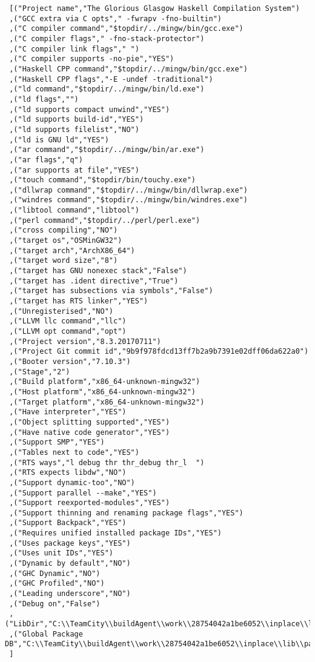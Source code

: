 \begin{verbatim}
 [("Project name","The Glorious Glasgow Haskell Compilation System")
 ,("GCC extra via C opts"," -fwrapv -fno-builtin")
 ,("C compiler command","$topdir/../mingw/bin/gcc.exe")
 ,("C compiler flags"," -fno-stack-protector")
 ,("C compiler link flags"," ")
 ,("C compiler supports -no-pie","YES")
 ,("Haskell CPP command","$topdir/../mingw/bin/gcc.exe")
 ,("Haskell CPP flags","-E -undef -traditional")
 ,("ld command","$topdir/../mingw/bin/ld.exe")
 ,("ld flags","")
 ,("ld supports compact unwind","YES")
 ,("ld supports build-id","YES")
 ,("ld supports filelist","NO")
 ,("ld is GNU ld","YES")
 ,("ar command","$topdir/../mingw/bin/ar.exe")
 ,("ar flags","q")
 ,("ar supports at file","YES")
 ,("touch command","$topdir/bin/touchy.exe")
 ,("dllwrap command","$topdir/../mingw/bin/dllwrap.exe")
 ,("windres command","$topdir/../mingw/bin/windres.exe")
 ,("libtool command","libtool")
 ,("perl command","$topdir/../perl/perl.exe")
 ,("cross compiling","NO")
 ,("target os","OSMinGW32")
 ,("target arch","ArchX86_64")
 ,("target word size","8")
 ,("target has GNU nonexec stack","False")
 ,("target has .ident directive","True")
 ,("target has subsections via symbols","False")
 ,("target has RTS linker","YES")
 ,("Unregisterised","NO")
 ,("LLVM llc command","llc")
 ,("LLVM opt command","opt")
 ,("Project version","8.3.20170711")
 ,("Project Git commit id","9b9f978fdcd13ff7b2a9b7391e02dff06da622a0")
 ,("Booter version","7.10.3")
 ,("Stage","2")
 ,("Build platform","x86_64-unknown-mingw32")
 ,("Host platform","x86_64-unknown-mingw32")
 ,("Target platform","x86_64-unknown-mingw32")
 ,("Have interpreter","YES")
 ,("Object splitting supported","YES")
 ,("Have native code generator","YES")
 ,("Support SMP","YES")
 ,("Tables next to code","YES")
 ,("RTS ways","l debug thr thr_debug thr_l  ")
 ,("RTS expects libdw","NO")
 ,("Support dynamic-too","NO")
 ,("Support parallel --make","YES")
 ,("Support reexported-modules","YES")
 ,("Support thinning and renaming package flags","YES")
 ,("Support Backpack","YES")
 ,("Requires unified installed package IDs","YES")
 ,("Uses package keys","YES")
 ,("Uses unit IDs","YES")
 ,("Dynamic by default","NO")
 ,("GHC Dynamic","NO")
 ,("GHC Profiled","NO")
 ,("Leading underscore","NO")
 ,("Debug on","False")
 ,("LibDir","C:\\TeamCity\\buildAgent\\work\\28754042a1be6052\\inplace\\lib")
 ,("Global Package DB","C:\\TeamCity\\buildAgent\\work\\28754042a1be6052\\inplace\\lib\\package.conf.d")
 ]
\end{verbatim}
